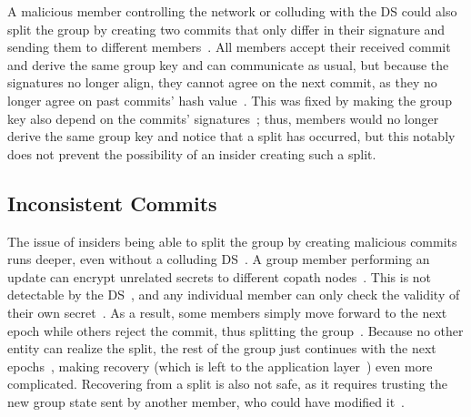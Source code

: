 \documentclass[conference]{IEEEtran}
\begin{document}
A malicious member controlling the network or colluding with the \ac{DS} could also split the group by creating two commits that only differ in their signature and sending them to different members~\cite{alwenInsiderSecurityMLS2022}.
All members accept their received commit and derive the same group key and can communicate as usual, but because the signatures no longer align, they cannot agree on the next commit, as they no longer agree on past commits' hash value~\cite{alwenInsiderSecurityMLS2022}.
This was fixed by making the group key also depend on the commits' signatures~\cite{alwenInsiderSecurityMLS2022,barnesMessagingLayerSecurity2023}; thus, members would no longer derive the same group key and notice that a split has occurred, but this notably does not prevent the possibility of an insider creating such a split.

\subsection{Inconsistent Commits}
The issue of insiders being able to split the group by creating malicious commits runs deeper, even without a colluding \ac{DS}~\cite{alwenInsiderSecurityMLS2022}.
A group member performing an update can encrypt unrelated secrets to different copath nodes~\cite{barnesMessagingLayerSecurity2023}.
This is not detectable by the \ac{DS}~\cite{beurdoucheMessagingLayerSecurity2025}, and any individual member can only check the validity of their own secret~\cite{alwenContinuousGroupKey2020,barnesMessagingLayerSecurity2023}.
As a result, some members simply move forward to the next epoch while others reject the commit, thus splitting the group~\cite{alwenInsiderSecurityMLS2022,barnesMessagingLayerSecurity2023}.
Because no other entity can realize the split, the rest of the group just continues with the next epochs~\cite{barnesMessagingLayerSecurity2023}, making recovery (which is left to the application layer~\cite{barnesMessagingLayerSecurity2023,beurdoucheMessagingLayerSecurity2025}) even more complicated.
Recovering from a split is also not safe, as it requires trusting the new group state sent by another member, who could have modified it~\cite{beurdoucheMessagingLayerSecurity2025}.
\end{document}
